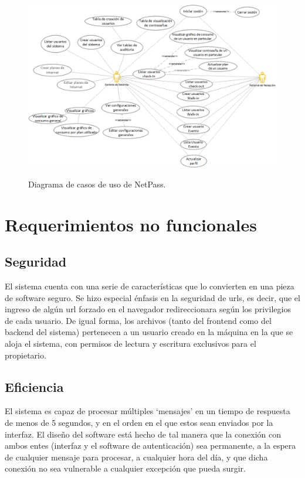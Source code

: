 \begin{figure}[ht]
  \centering
  \includegraphics[scale=0.6,type=png,ext=.png,read=.png]{imagenes/UseCases} \\
  \caption{Diagrama de casos de uso de NetPass.}
  \label{fig:UseCases}
\end{figure}

\section{Requerimientos no funcionales} \label{sect:Requerimientos no funcionales}
\subsection{Seguridad}
		El sistema cuenta con una serie de características que lo convierten en una pieza de software seguro. Se hizo especial énfasis en la seguridad de urls, es decir, que el ingreso de algún url forzado en el navegador redireccionara según los privilegios de cada usuario. De igual forma, los archivos (tanto del frontend como del backend del sistema) pertenecen a un usuario creado en la máquina en la que se aloja el sistema, con permisos de lectura y escritura exclusivos para el propietario.

\subsection{Eficiencia}
		El sistema es capaz de procesar múltiples ‘mensajes’ en un tiempo de respuesta de menos de 5 segundos, y en el orden en el que estos sean enviados por la interfaz. El diseño del software está hecho de tal manera que la conexión con ambos entes (interfaz y el software de autenticación) sea permanente, a la espera de cualquier mensaje para procesar, a cualquier hora del día, y que dicha conexión no sea vulnerable a cualquier excepción que pueda surgir.

